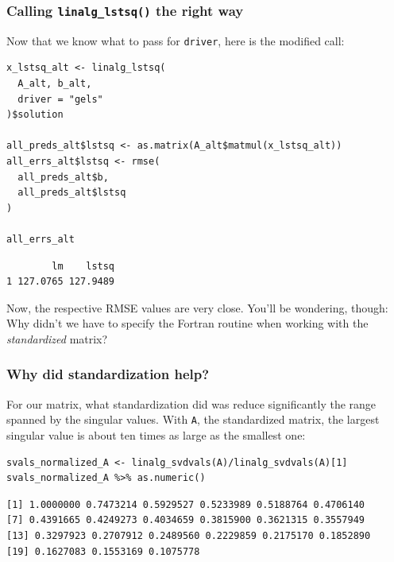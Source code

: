 \documentclass[
  letterpaper,
]{krantz}
\begin{document}
\hypertarget{calling-linalg_lstsq-the-right-way}{%
\subsubsection{\texorpdfstring{Calling \texttt{linalg\_lstsq()} the
right
way}{Calling linalg\_lstsq() the right way}}\label{calling-linalg_lstsq-the-right-way}}

Now that we know what to pass for \texttt{driver}, here is the modified
call:

\begin{verbatim}
x_lstsq_alt <- linalg_lstsq(
  A_alt, b_alt,
  driver = "gels"
)$solution

all_preds_alt$lstsq <- as.matrix(A_alt$matmul(x_lstsq_alt))
all_errs_alt$lstsq <- rmse(
  all_preds_alt$b,
  all_preds_alt$lstsq
)

all_errs_alt
\end{verbatim}

\begin{verbatim}
        lm    lstsq
1 127.0765 127.9489
\end{verbatim}

Now, the respective RMSE values are very close. You'll be wondering,
though: Why didn't we have to specify the Fortran routine when working
with the \emph{standardized} matrix?

\hypertarget{why-did-standardization-help}{%
\subsubsection{Why did standardization
help?}\label{why-did-standardization-help}}

For our matrix, what standardization did was reduce significantly the
range spanned by the singular values. With \texttt{A}, the standardized
matrix, the largest singular value is about ten times as large as the
smallest one:

\begin{verbatim}
svals_normalized_A <- linalg_svdvals(A)/linalg_svdvals(A)[1]
svals_normalized_A %>% as.numeric()
\end{verbatim}

\begin{verbatim}
[1] 1.0000000 0.7473214 0.5929527 0.5233989 0.5188764 0.4706140
[7] 0.4391665 0.4249273 0.4034659 0.3815900 0.3621315 0.3557949
[13] 0.3297923 0.2707912 0.2489560 0.2229859 0.2175170 0.1852890
[19] 0.1627083 0.1553169 0.1075778
\end{verbatim}
\end{document}
